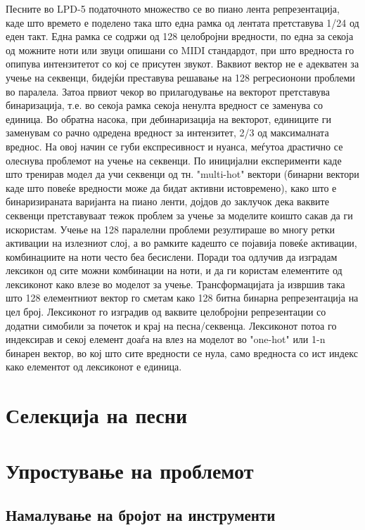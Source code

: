 Песните во LPD-5 податочното множество се во пиано лента репрезентација, каде што времето е поделено така што една рамка од лентата претставува 1/24 од еден такт. Една рамка се содржи од 128 целобројни вредности, по една за секоја од можните ноти или звуци опишани со MIDI стандардот, при што вредноста го опипува интензитетот со кој се присутен звукот. Ваквиот вектор не е адекватен за учење на секвенци, бидејќи преставува решавање на 128 регресионони проблеми во паралела. Затоа првиот чекор во прилагодување на векторот претставува бинаризација, т.е. во секоја рамка секоја ненулта вредност се заменува со единица. Во обратна насока, при дебинаризација на векторот, единиците ги заменувам со рачно одредена вредност за интензитет, 2/3 од максималната вреднос. На овој начин се губи експресивност и нуанса, меѓутоа драстично се олеснува проблемот на учење на секвенци. 
По иницијални експерименти каде што тренирав модел да учи секвенци од тн. "multi-hot" вектори (бинарни вектори каде што повеќе вредности може да бидат активни истовремено), како што е бинаризираната варијанта на пиано ленти, дојдов до заклучок дека ваквите секвенци претставуваат тежок проблем за учење за моделите коишто сакав да ги искористам. Учење на 128 паралелни проблеми резултираше во многу ретки активации на излезниот слој, а во рамките кадешто се појавија повеќе активации, комбинациите на ноти често беа бесислени. Поради тоа одлучив да изградам лексикон од сите можни комбинации на ноти, и да ги користам елементите од лексиконот како влезе во моделот за учење. Трансформацијата ја извршив така што 128 елементниот вектор го сметам како 128 битна бинарна репрезентација на цел број. Лексиконот го изградив од ваквите целобројни репрезентации со додатни симобили за почеток и крај на песна/секвенца. Лексиконот потоа го индексирав и секој елемент доаѓа на влез на моделот во "one-hot" или 1-n бинарен вектор, во кој што сите вредности се нула, само вредноста со ист индекс како елементот од лексиконот е единица.

\section{Селекција на песни}


\section{Упростување на проблемот}

\subsection{Намалување на бројот на инструменти}

